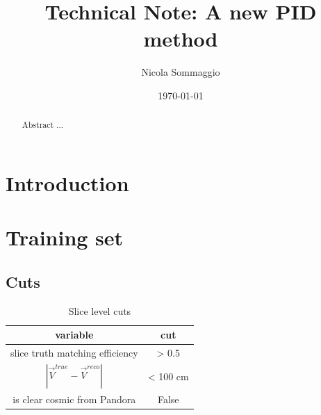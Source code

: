 \documentclass[11pt,a4paper]{article}
\title{Technical Note: A new PID method}
\author[1]{Nicola Sommaggio}
\affil[1]{University of Pisa}
\date{\today}
\begin{document}
\linenumbers

\maketitle

\tableofcontents

\begin{abstract}
Abstract ...
\end{abstract}

\section{Introduction}

\section{Training set}
\subsection{Cuts}

\begin{table}
  \centering
  \begin{tabular}{c|c}
    variable & cut \\ \hline
    slice truth matching efficiency & > 0.5 \\ \hline
    $|\vec{V}^{true}-\vec{V}^{reco}|$ & < 100 cm \\ \hline
    is clear cosmic from Pandora & False \\ \hline 
  \end{tabular}
  \caption{Slice level cuts}
  \label{tab:slice_cuts_training_set}
\end{table}
\end{document}

